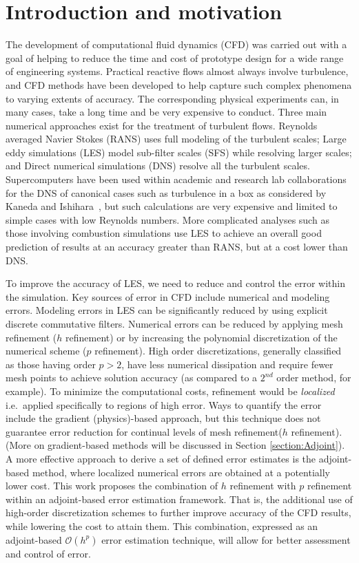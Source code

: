 \section{Introduction and motivation}

The development of computational fluid dynamics (CFD) was carried out with a goal of helping to reduce the time and cost of prototype design for a wide range of engineering systems. Practical reactive flows almost always involve turbulence, and CFD methods have been developed to help capture such complex phenomena to varying extents of accuracy. The corresponding physical experiments can, in many cases, take a long time and be very expensive to conduct. Three main numerical approaches exist for the treatment of turbulent flows. Reynolds averaged Navier Stokes (RANS) uses full modeling of the turbulent scales; Large eddy simulations (LES) model sub-filter scales (SFS) while resolving larger scales; and Direct numerical simulations (DNS) resolve all the turbulent scales. Supercomputers have been used within academic and research lab collaborations for the DNS of canonical cases such as turbulence in a box as considered by Kaneda and Ishihara~\cite{kaneda:2006}, but such calculations are very expensive and limited to simple cases with low Reynolds numbers. More complicated analyses such as those involving combustion simulations use LES to achieve an overall good prediction of results at an accuracy greater than RANS, but at a cost lower than DNS.\par 

To improve the accuracy of LES, we need to reduce and control the error within the simulation. Key sources of error in CFD include numerical and modeling errors. Modeling errors in LES can be significantly reduced by using explicit discrete commutative filters. Numerical errors can be reduced by applying mesh refinement ($h$ refinement) or by increasing the polynomial discretization of the numerical scheme ($p$ refinement). High order discretizations, generally classified as those having order $p>2$, have less numerical dissipation and require fewer mesh points to achieve solution accuracy (as compared to a $2^{nd}$ order method, for example). To minimize the computational costs, refinement would be \textit{localized} i.e.\ applied specifically to regions of high error. Ways to quantify the error include the gradient (physics)-based approach, but this technique does not guarantee error reduction for continual levels of mesh refinement($h$ refinement).  (More on gradient-based methods will be discussed in Section \ref{section:Adjoint}). A more effective approach to derive a set of defined error estimates is the adjoint-based method, where localized numerical errors are obtained at a potentially lower cost. This work proposes the combination of $h$ refinement with $p$ refinement within an adjoint-based error estimation framework. That is, the additional use of high-order discretization schemes  to further improve accuracy of the CFD results, while lowering the cost to attain them. This combination, expressed as an adjoint-based $\mathcal{O}(h^p)$ error estimation technique, will allow for better assessment and control of error.\par 